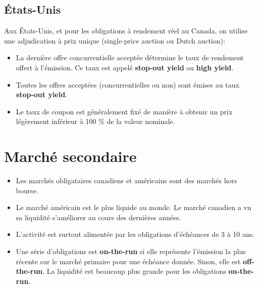 \documentclass[letterpaper, 12pt]{article}
\newcommand{\1}{\mathds{1}}	%
\theoremstyle{definition}
\begin{document}
\subsection{États-Unis}
Aux États-Unis, et pour les obligations à rendement réel au Canada, on utilise une adjudication à prix unique (single-price auction ou Dutch auction):  
\begin{itemize}
\item La dernière offre concurrentielle acceptée détermine le taux de rendement offert à l’émission.  Ce taux est appelé \textbf{stop-out yield} ou \textbf{high yield}.
\item Toutes les offres acceptées (concurrentielles ou non) sont émises au taux \textbf{stop-out yield}.
\item Le taux de coupon est généralement fixé de manière à obtenir un prix légèrement inférieur à 100 \% de la valeur nominale.  
\end{itemize}

\section{Marché secondaire}
\begin{itemize}
\item Les marchés obligataires canadiens et américains sont des marchés hors bourse.  
\item Le marché américain est le plus liquide au monde.  Le marché canadien a vu sa liquidité s’améliorer au cours des dernières années.  
\item L’activité est surtout alimentée par les obligations d’échéances de 3 à 10 ans.  
\item Une série d’obligations est \textbf{on-the-run} si elle représente l’émission la plus récente sur le marché primaire pour une échéance donnée.  Sinon, elle est \textbf{off-the-run}.  La liquidité est beaucoup plus grande pour les obligations \textbf{on-the-run}.  
\end{itemize}
\end{document}
